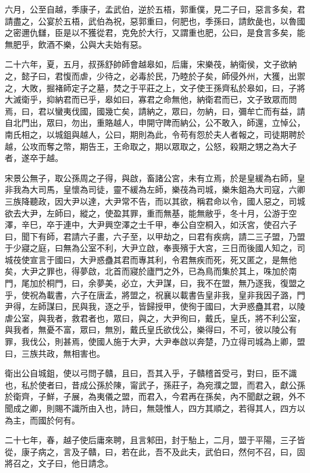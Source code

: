 \begin{pinyinscope}
六月，公至自越，季康子，孟武伯，逆於五梧，郭重僕，見二子曰，惡言多矣，君請盡之，公宴於五梧，武伯為祝，惡郭重曰，何肥也，季孫曰，請飲彘也，以魯國之密邇仇讎，臣是以不獲從君，克免於大行，又謂重也肥，公曰，是食言多矣，能無肥乎，飲酒不樂，公與大夫始有惡。

二十六年，夏，五月，叔孫舒帥師會越皋如，后庸，宋樂茷，納衛侯，文子欲納之，懿子曰，君愎而虐，少待之，必毒於民，乃睦於子矣，師侵外州，大獲，出禦之，大敗，掘褚師定子之墓，焚之于平莊之上，文子使王孫齊私於皋如，曰，子將大滅衛乎，抑納君而已乎，皋如曰，寡君之命無他，納衛君而已，文子致眾而問焉，曰，君以蠻夷伐國，國幾亡矣，請納之，眾曰，勿納，曰，彌牟亡而有益，請自北門出，眾曰，勿出，重賂越人，申開守陴而納公，公不敢入，師還，立悼公，南氏相之，以城鉏與越人，公曰，期則為此，令苟有怨於夫人者報之，司徒期聘於越，公攻而奪之幣，期告王，王命取之，期以眾取之，公怒，殺期之甥之為大子者，遂卒于越。

宋景公無子，取公孫周之子得，與啟，畜諸公宮，未有立焉，於是皇緩為右師，皇非我為大司馬，皇懷為司徒，靈不緩為左師，樂茷為司城，樂朱鉏為大司寇，六卿三族降聽政，因大尹以達，大尹常不告，而以其欲，稱君命以令，國人惡之，司城欲去大尹，左師曰，縱之，使盈其罪，重而無基，能無敝乎，冬十月，公游于空澤，辛巳，卒于連中，大尹興空澤之士千甲，奉公自空桐入，如沃宮，使召六子曰，聞下有師，君請六子畫，六子至，以甲劫之，曰君有疾病，請二三子盟，乃盟于少寢之庭，曰無為公室不利，大尹立啟，奉喪殯于大宮，三日而後國人知之，司城茷使宣言于國曰，大尹惑蠱其君而專其利，令君無疾而死，死又匿之，是無他矣，大尹之罪也，得夢啟，北首而寢於廬門之外，已為鳥而集於其上，咮加於南門，尾加於桐門，曰，余夢美，必立，大尹謀，曰，我不在盟，無乃逐我，復盟之乎，使祝為載書，六子在唐孟，將盟之，祝襄以載書告皇非我，皇非我因子潞，門尹得，左師謀曰，民與我，逐之乎，皆歸授甲，使徇于國曰，大尹惑蠱其君，以陵虐公室，與我者，救君者也，眾曰，與之，大尹徇曰，戴氏，皇氏，將不利公室，與我者，無憂不富，眾曰，無別，戴氏皇氏欲伐公，樂得曰，不可，彼以陵公有罪，我伐公，則甚焉，使國人施于大尹，大尹奉啟以奔楚，乃立得司城為上卿，盟曰，三族共政，無相害也。

衛出公自城鉏，使以弓問子贛，且曰，吾其入乎，子贛稽首受弓，對曰，臣不識也，私於使者曰，昔成公孫於陳，甯武子，孫莊子，為宛濮之盟，而君入，獻公孫於衛齊，子鮮，子展，為夷儀之盟，而君入，今君再在孫矣，內不聞獻之親，外不聞成之卿，則賜不識所由入也，詩曰，無競惟人，四方其順之，若得其人，四方以為主，而國於何有。

二十七年，春，越子使后庸來聘，且言邾田，封于駘上，二月，盟于平陽，三子皆從，康子病之，言及子贛，曰，若在此，吾不及此夫，武伯曰，然何不召，曰，固將召之，文子曰，他日請念。


\end{pinyinscope}
